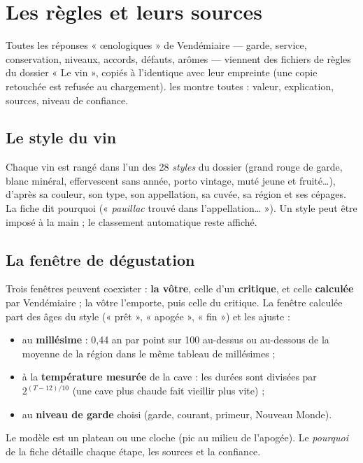 \documentclass[11pt,a4paper]{article}
\begin{document}
\section{Les règles et leurs sources}
\label{sec:regles}
Toutes les réponses « œnologiques » de Vendémiaire — garde, service, conservation, niveaux, accords,
défauts, arômes — viennent des fichiers de règles du dossier « Le vin », copiés à l'identique avec leur
empreinte (une copie retouchée est refusée au chargement). 
les montre toutes : valeur, explication, sources, niveau de confiance.


\subsection{Le style du vin}
Chaque vin est rangé dans l'un des 28 \emph{styles} du dossier (grand rouge de garde, blanc minéral,
effervescent sans année, porto vintage, muté jeune et fruité…), d'après sa couleur, son type, son
appellation, sa cuvée, sa région et ses cépages. La fiche dit pourquoi (« \emph{pauillac} trouvé dans
l'appellation… »). Un style peut être imposé à la main ; le classement automatique reste affiché.

\subsection{La fenêtre de dégustation}
Trois fenêtres peuvent coexister : \textbf{la vôtre}, celle d'un \textbf{critique}, et celle
\textbf{calculée} par Vendémiaire ; la vôtre l'emporte, puis celle du critique. La fenêtre calculée part des
âges du style (« prêt », « apogée », « fin ») et les ajuste :
\begin{itemize}
  \item au \textbf{millésime} : 0,44 an par point sur 100 au-dessus ou au-dessous de la moyenne de la région
        dans le même tableau de millésimes ;
  \item à la \textbf{température mesurée} de la cave : les durées sont divisées par
        $2^{(T-12)/10}$ (une cave plus chaude fait vieillir plus vite) ;
  \item au \textbf{niveau de garde} choisi (garde, courant, primeur, Nouveau Monde).
\end{itemize}
Le modèle est un plateau ou une cloche (pic au milieu de l'apogée). Le \emph{pourquoi} de la fiche détaille
chaque étape, les sources et la confiance.
\end{document}
